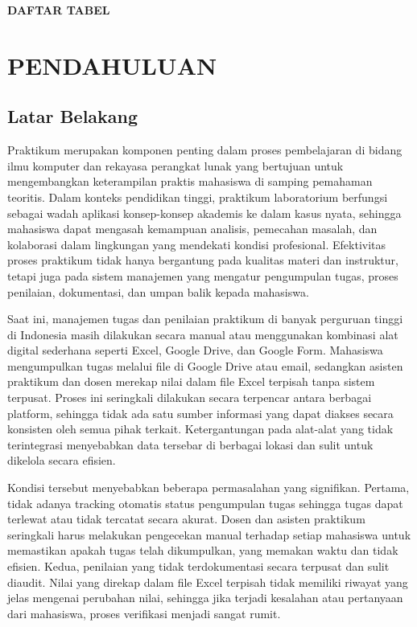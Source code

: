 \documentclass[12pt,a4paper,twoside]{report}
\begin{document}
\begin{center}
    \Large\textbf{DAFTAR TABEL}
\end{center}

\renewcommand{\thefigure}{\arabic{chapter}.\arabic{figure}}
\renewcommand{\thetable}{\arabic{chapter}.\arabic{table}}

\listoftables
\newpage


\chapter{PENDAHULUAN}

\section{Latar Belakang}
Praktikum merupakan komponen penting dalam proses pembelajaran di bidang ilmu komputer dan rekayasa perangkat lunak yang bertujuan untuk mengembangkan keterampilan praktis mahasiswa di samping pemahaman teoritis. Dalam konteks pendidikan tinggi, praktikum laboratorium berfungsi sebagai wadah aplikasi konsep-konsep akademis ke dalam kasus nyata, sehingga mahasiswa dapat mengasah kemampuan analisis, pemecahan masalah, dan kolaborasi dalam lingkungan yang mendekati kondisi profesional. Efektivitas proses praktikum tidak hanya bergantung pada kualitas materi dan instruktur, tetapi juga pada sistem manajemen yang mengatur pengumpulan tugas, proses penilaian, dokumentasi, dan umpan balik kepada mahasiswa.

Saat ini, manajemen tugas dan penilaian praktikum di banyak perguruan tinggi di Indonesia masih dilakukan secara manual atau menggunakan kombinasi alat digital sederhana seperti Excel, Google Drive, dan Google Form. Mahasiswa mengumpulkan tugas melalui file di Google Drive atau email, sedangkan asisten praktikum dan dosen merekap nilai dalam file Excel terpisah tanpa sistem terpusat. Proses ini seringkali dilakukan secara terpencar antara berbagai platform, sehingga tidak ada satu sumber informasi yang dapat diakses secara konsisten oleh semua pihak terkait. Ketergantungan pada alat-alat yang tidak terintegrasi menyebabkan data tersebar di berbagai lokasi dan sulit untuk dikelola secara efisien.

Kondisi tersebut menyebabkan beberapa permasalahan yang signifikan. Pertama, tidak adanya tracking otomatis status pengumpulan tugas sehingga tugas dapat terlewat atau tidak tercatat secara akurat. Dosen dan asisten praktikum seringkali harus melakukan pengecekan manual terhadap setiap mahasiswa untuk memastikan apakah tugas telah dikumpulkan, yang memakan waktu dan tidak efisien. Kedua, penilaian yang tidak terdokumentasi secara terpusat dan sulit diaudit. Nilai yang direkap dalam file Excel terpisah tidak memiliki riwayat yang jelas mengenai perubahan nilai, sehingga jika terjadi kesalahan atau pertanyaan dari mahasiswa, proses verifikasi menjadi sangat rumit.
\end{document}

